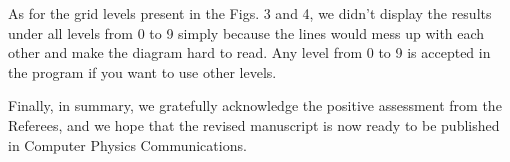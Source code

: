 \documentclass[a4paper,11pt]{article}
\begin{document}
As for the grid levels present in the Figs. 3 and 4, we didn't display the results under all levels from 0 to 9 simply because the lines would mess up with each other and make the diagram hard to read.
Any level from 0 to 9 is accepted in the program if you want to use other levels.


\vspace{5em}

Finally, in summary, we gratefully acknowledge the positive assessment from the Referees, and we hope that the revised manuscript is now ready to be published in Computer Physics Communications.
\end{document}
